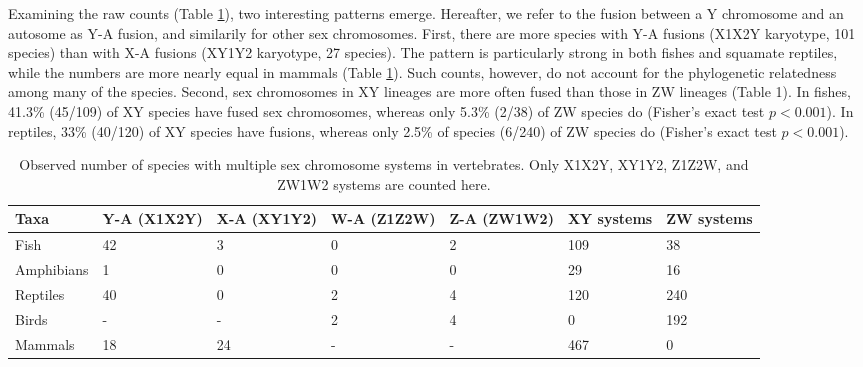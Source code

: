 Examining the raw counts (Table \ref{tab:fusions}), two interesting patterns emerge. Hereafter, we refer to the fusion between a Y chromosome and an autosome as Y-A fusion, and similarily for other sex chromosomes. First, there are more species with Y-A fusions (X1X2Y karyotype, 101 species) than with X-A fusions (XY1Y2 karyotype, 27 species). The pattern is particularly strong in both fishes and squamate reptiles, while the numbers are more nearly equal in mammals (Table \ref{tab:fusions}). Such counts, however, do not account for the phylogenetic relatedness among many of the species. Second, sex chromosomes in XY lineages are more often fused than those in ZW lineages (Table 1). In fishes, 41.3\% (45/109) of XY species have fused sex chromosomes, whereas only 5.3\% (2/38) of ZW species do (Fisher's exact test $p < \text{0.001}$). In reptiles, 33\% (40/120) of XY species have fusions, whereas only 2.5\% of species (6/240) of ZW species do (Fisher's exact test $p < \text{0.001}$).

\begin{table}
\centering
\begin{tabular}{|p{} |p{} |p{}|p{}|p{}|p{}|p{} |}
\hline
Taxa & Y-A (X1X2Y) & X-A (XY1Y2) & W-A (Z1Z2W) & Z-A (ZW1W2) & XY systems & ZW systems \\ \hline
Fish & 42 & 3 & 0 & 2 & 109 & 38 \\\hline
Amphibians & 1 & 0 & 0 & 0 & 29 & 16 \\\hline
Reptiles & 40 & 0 & 2 & 4 & 120 & 240 \\\hline
Birds & - & - & 2 & 4 & 0 & 192\\\hline
Mammals & 18 & 24 & - & - & 467 & 0\\\hline
\end{tabular}
\caption[Records of sex chromosome-autosome fusions in vertebrates]{Observed number of species with multiple sex chromosome systems in vertebrates. Only X1X2Y, XY1Y2, Z1Z2W, and ZW1W2 systems are counted here.}
\label{tab:fusions}
\end{table}
   


